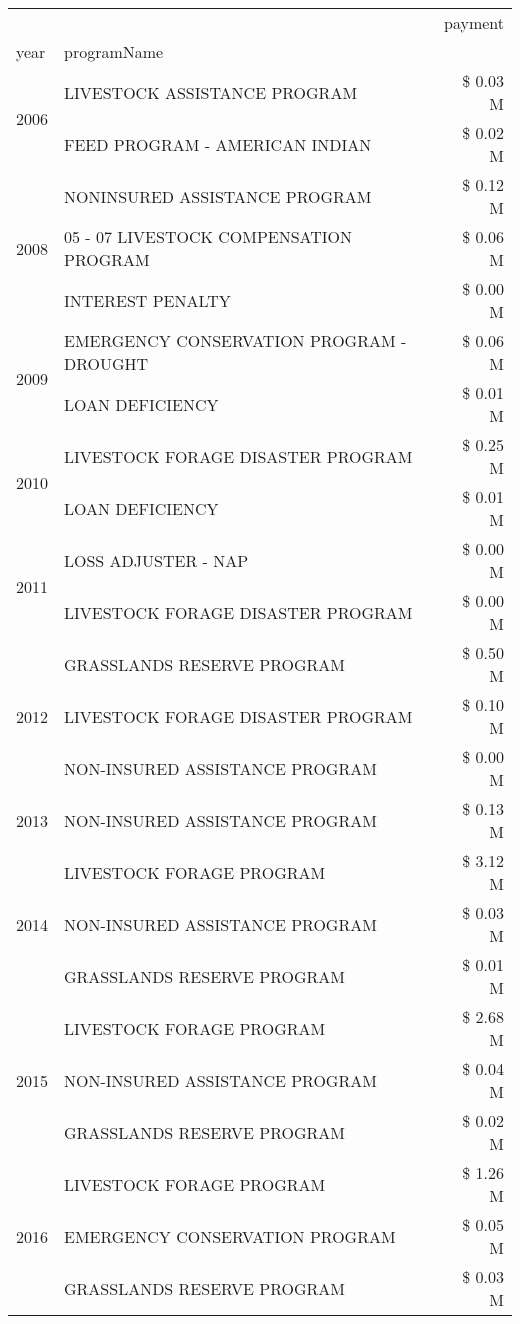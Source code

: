 \begin{tabular}{llr}
\toprule
 &  & payment \\
year & programName &  \\
\midrule
\multirow[t]{2}{*}{2006} & LIVESTOCK ASSISTANCE PROGRAM & \$ 0.03 M \\
 & FEED PROGRAM - AMERICAN INDIAN & \$ 0.02 M \\
\cline{1-3}
\multirow[t]{3}{*}{2008} & NONINSURED ASSISTANCE PROGRAM & \$ 0.12 M \\
 & 05 - 07 LIVESTOCK COMPENSATION PROGRAM & \$ 0.06 M \\
 & INTEREST PENALTY & \$ 0.00 M \\
\cline{1-3}
\multirow[t]{2}{*}{2009} & EMERGENCY CONSERVATION PROGRAM - DROUGHT & \$ 0.06 M \\
 & LOAN DEFICIENCY & \$ 0.01 M \\
\cline{1-3}
\multirow[t]{2}{*}{2010} & LIVESTOCK FORAGE DISASTER  PROGRAM & \$ 0.25 M \\
 & LOAN DEFICIENCY & \$ 0.01 M \\
\cline{1-3}
\multirow[t]{2}{*}{2011} & LOSS ADJUSTER - NAP & \$ 0.00 M \\
 & LIVESTOCK FORAGE DISASTER PROGRAM & \$ 0.00 M \\
\cline{1-3}
\multirow[t]{3}{*}{2012} & GRASSLANDS RESERVE PROGRAM & \$ 0.50 M \\
 & LIVESTOCK FORAGE DISASTER PROGRAM & \$ 0.10 M \\
 & NON-INSURED ASSISTANCE PROGRAM & \$ 0.00 M \\
\cline{1-3}
2013 & NON-INSURED ASSISTANCE PROGRAM & \$ 0.13 M \\
\cline{1-3}
\multirow[t]{3}{*}{2014} & LIVESTOCK FORAGE PROGRAM & \$ 3.12 M \\
 & NON-INSURED ASSISTANCE PROGRAM & \$ 0.03 M \\
 & GRASSLANDS RESERVE PROGRAM & \$ 0.01 M \\
\cline{1-3}
\multirow[t]{3}{*}{2015} & LIVESTOCK FORAGE PROGRAM & \$ 2.68 M \\
 & NON-INSURED ASSISTANCE PROGRAM & \$ 0.04 M \\
 & GRASSLANDS RESERVE PROGRAM & \$ 0.02 M \\
\cline{1-3}
\multirow[t]{3}{*}{2016} & LIVESTOCK FORAGE PROGRAM & \$ 1.26 M \\
 & EMERGENCY CONSERVATION PROGRAM & \$ 0.05 M \\
 & GRASSLANDS RESERVE PROGRAM & \$ 0.03 M \\

\end{tabular}
